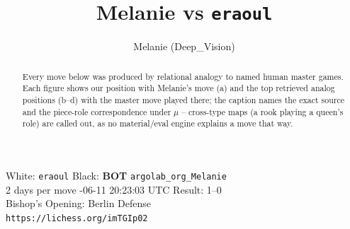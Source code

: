 \documentclass[11pt]{article}
\title{Melanie vs \texttt{eraoul}}
\author{Melanie (Deep\_Vision)}
\date{}
\begin{document}
\maketitle
\begin{center}\small
White: \texttt{eraoul} \quad Black: \textbf{BOT} \texttt{argolab\_org\_Melanie} \\
2 days per move -06-11 20:23:03 UTC \quad Result: 1--0 \\
Bishop's Opening: Berlin Defense \\
\texttt{https://lichess.org/imTGIp02}
\end{center}
\begin{abstract}Every move below was produced by relational analogy to named human master games. Each figure shows our position with Melanie's move (a) and the top retrieved analog positions (b--d) with the master move played there; the caption names the exact source and the piece-role correspondence under $\mu$ -- cross-type maps (a rook playing a queen's role) are called out, as no material/eval engine explains a move that way.\end{abstract}
\end{document}
